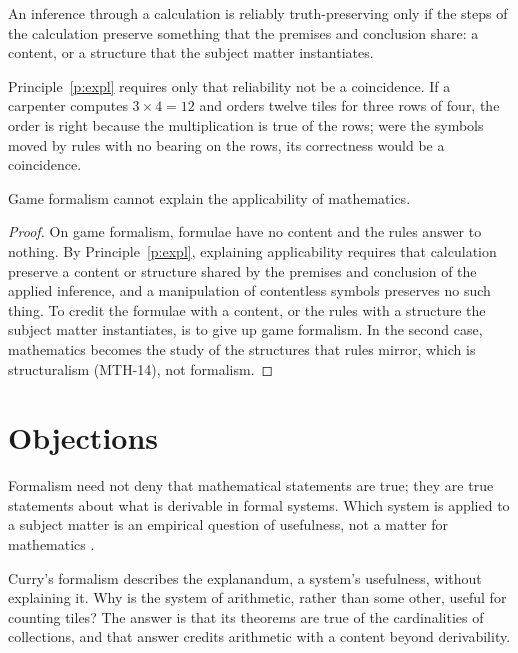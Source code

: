 \documentclass{situationist-preprint}
\begin{document}
\begin{principle}\label{p:expl}
An inference through a calculation is reliably truth-preserving only if the steps of the calculation preserve something that the premises and conclusion share: a content, or a structure that the subject matter instantiates.
\end{principle}

Principle~\ref{p:expl} requires only that reliability not be a coincidence. If a carpenter computes $3 \times 4 = 12$ and orders twelve tiles for three rows of four, the order is right because the multiplication is true of the rows; were the symbols moved by rules with no bearing on the rows, its correctness would be a coincidence.

\begin{theorem}\label{t:main}
Game formalism cannot explain the applicability of mathematics.
\end{theorem}

\begin{proof}
On game formalism, formulae have no content and the rules answer to nothing. By Principle~\ref{p:expl}, explaining applicability requires that calculation preserve a content or structure shared by the premises and conclusion of the applied inference, and a manipulation of contentless symbols preserves no such thing. To credit the formulae with a content, or the rules with a structure the subject matter instantiates, is to give up game formalism. In the second case, mathematics becomes the study of the structures that rules mirror, which is structuralism (MTH-14), not formalism.
\end{proof}

\section{Objections}

\begin{objection}[Curry]
Formalism need not deny that mathematical statements are true; they are true statements about what is derivable in formal systems. Which system is applied to a subject matter is an empirical question of usefulness, not a matter for mathematics \citep{Curry1951}.
\end{objection}

\begin{reply}
Curry's formalism describes the explanandum, a system's usefulness, without explaining it. Why is the system of arithmetic, rather than some other, useful for counting tiles? The answer is that its theorems are true of the cardinalities of collections, and that answer credits arithmetic with a content beyond derivability.
\end{reply}
\end{document}
